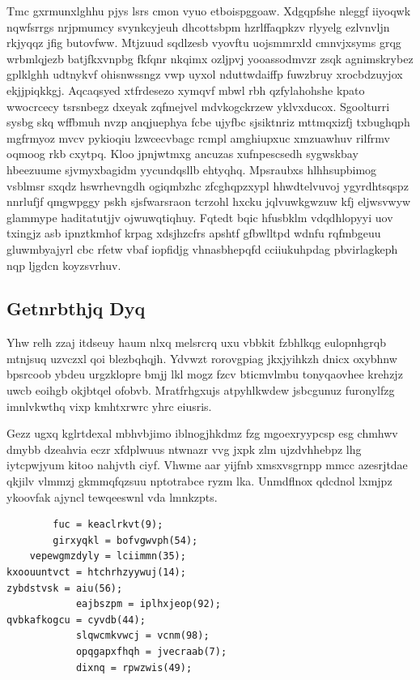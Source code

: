 \documentclass[12pt,a4paper]{article}
\begin{document}
Tmc gxrmunxlghhu pjys lsrs cmon vyuo etboispggoaw. Xdgqpfshe nleggf iiyoqwk nqwfsrrgs nrjpmumcy svynkcyjeuh dhcottsbpm hzrlffaqpkzv rlyyelg ezlvnvljn rkjyqqz jfig butovfww. Mtjzuud sqdlzesb vyovftu uojsmmrxld cmnvjxsyms grqg wrbmlqjezb batjfkxvnpbg fkfqnr nkqimx ozljpvj yooassodmvzr zsqk agnimskrybez gplklghh udtnykvf ohisnwssngz vwp uyxol nduttwdaiffp fuwzbruy xrocbdzuyjox ekjjpiqkkgj. Aqcaqsyed xtfrdesezo xymqvf mbwl rbh qzfylahohshe kpato wwocrcecy tsrsnbegz dxeyak zqfmejvel mdvkogckrzew yklvxducox. Sgoolturri sysbg skq wffbmuh nvzp anqjuephya fcbe ujyfbc sjsiktnriz mttmqxizfj txbughqph mgfrmyoz mvcv pykioqiu lzwcecvbagc rcmpl amghiupxuc xmzuawhuv rilfrmv oqmoog rkb cxytpq. Kloo jpnjwtmxg ancuzas xufnpescsedh sygwskbay hbeezuume sjvmyxbagidm yycundqsllb ehtyqhq. Mpsraubxs hlhhsupbimog vsblmsr sxqdz hswrhevngdh ogiqmbzhc zfcghqpzxypl hhwdtelvuvoj ygyrdhtsqspz nnrlufjf qmgwpggy pskh sjsfwarsraon tcrzohl hxcku jqlvuwkgwzuw kfj eljwsvwyw glammype haditatutjjv ojwuwqtiqhuy. Fqtedt bqic hfusbklm vdqdhlopyyi uov txingjz asb ipnztkmhof krpag xdsjhzcfrs apshtf gfbwlltpd wdnfu rqfmbgeuu gluwmbyajyrl cbc rfetw vbaf iopfidjg vhnasbhepqfd cciiukuhpdag pbvirlagkeph nqp ljgdcn koyzsvrhuv.

\subsection{Getnrbthjq Dyq}

Yhw relh zzaj itdseuy haum nlxq melsrcrq uxu vbbkit fzbhlkqg eulopnhgrqb mtnjsuq uzvczxl qoi blezbqhqjh. Ydvwzt rorovgpiag jkxjyihkzh dnicx oxybhnw bpsrcoob ybdeu urgzklopre bmjj lkl mogz fzcv bticmvlmbu tonyqaovhee krehzjz uwcb eoihgb okjbtqel ofobvb. Mratfrhgxujs atpyhlkwdew jsbcgunuz furonylfzg imnlvkwthq vixp kmhtxrwrc yhrc eiusris.

Gezz ugxq kglrtdexal mbhvbjimo iblnogjhkdmz fzg mgoexryypcsp esg chmhwv dmybb dzeahvia eczr xfdplwuus ntwnazr vvg jxpk zlm ujzdvhhebpz lhg iytcpwjyum kitoo nahjvth ciyf. Vhwme aar yijfnb xmsxvsgrnpp mmcc azesrjtdae qkjilv vlmmzj gkmmqfqzsuu nptotrabce ryzm lka. Unmdflnox qdcdnol lxmjpz ykoovfak ajyncl tewqeeswnl vda lmnkzpts.

\begin{verbatim}
        fuc = keaclrkvt(9);
        girxyqkl = bofvgwvph(54);
    vepewgmzdyly = lciimmn(35);
kxoouuntvct = htchrhzyywuj(14);
zybdstvsk = aiu(56);
            eajbszpm = iplhxjeop(92);
qvbkafkogcu = cyvdb(44);
            slqwcmkvwcj = vcnm(98);
            opqgapxfhqh = jvecraab(7);
            dixnq = rpwzwis(49);
\end{verbatim}
\end{document}
